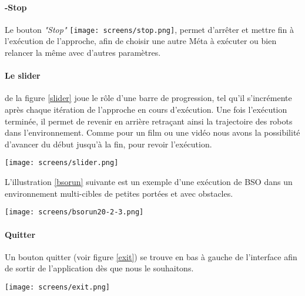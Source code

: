 \paragraph{-Stop}
Le bouton \textit{"Stop"}	\texttt{[image: screens/stop.png]}, permet d'arrêter et mettre fin à l'exécution de l'approche, afin de choisir une autre Méta à exécuter ou bien relancer la même avec d'autres paramètres.


\paragraph{Le slider} de la figure \ref{slider} joue le rôle d'une barre de progression, tel qu'il s'incrémente après chaque itération de l'approche en cours d'exécution. Une fois l'exécution terminée, il permet de revenir en arrière retraçant ainsi la trajectoire des robots dans l'environnement. Comme pour un film ou une vidéo nous avons la possibilité d'avancer du début jusqu'à la fin, pour revoir l'exécution.

\begin{center}	  
	\captionsetup{width=1\linewidth}
	\texttt{[image: screens/slider.png]}%
	\vspace{-0.1 cm}
	\label{slider}%
\end{center}

L'illustration \ref{bsorun} suivante est un exemple d'une exécution de BSO dans un environnement multi-cibles de petites portées et avec obstacles.
\begin{center}	  
	\captionsetup{width=1\linewidth}
	\texttt{[image: screens/bsorun20-2-3.png]}%
	\vspace{-0.1 cm}
	\label{bsorun}%
\end{center}


\paragraph{Quitter}
Un bouton quitter (voir figure \ref{exit}) se trouve en bas à gauche de l'interface afin de sortir de l'application dès que nous le souhaitons.

\begin{center}	  
	\captionsetup{width=1\linewidth}
	\texttt{[image: screens/exit.png]}%
	\vspace{-0.1 cm}
	\label{exit}%
\end{center}




